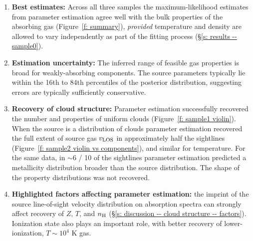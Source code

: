 \documentclass[fleqn,usenatbib]{mnras}
\begin{document}
\begin{enumerate}
    \item \textbf{Best estimates:} Across all three samples the maximum-likelihood estimates from parameter estimation agree well with the bulk properties of the absorbing gas (Figure~\ref{f: summary}), \textit{provided} temperature and density are allowed to vary independently as part of the fitting process (\S\ref{s: results -- sample0}).
    \item \textbf{Estimation uncertainty:} The inferred range of feasible gas properties is broad for weakly-absorbing components. The source parameters typically lie within the 16th to 84th percentiles of the posterior distribution, suggesting errors are typically sufficiently conservative.
    \item \textbf{Recovery of cloud structure:} Parameter estimation successfully recovered the number and properties of uniform clouds (Figure~\ref{f: sample1 violin}). When the source is a distribution of clouds parameter estimation recovered the full extent of source gas $v_{\rm LOS}$ in approximately half the sightlines (Figure~\ref{f: sample2 violin vs components}), and similar for temperature. For the same data, in $\sim 6$ / 10 of the sightlines parameter estimation predicted a metallicity distribution broader than the source distribution. The shape of the property distributions was not recovered.
    \item \textbf{Highlighted factors affecting parameter estimation:} the imprint of the source line-of-sight velocity distribution on absorption spectra can strongly affect recovery of $Z$, $T$, and $n_{\rm H}$ (\S\ref{s: discussion -- cloud structure -- factors}). Ionization state also plays an important role, with better recovery of lower-ionization, $T \sim 10^4$ K gas.
\end{enumerate}
\end{document}
